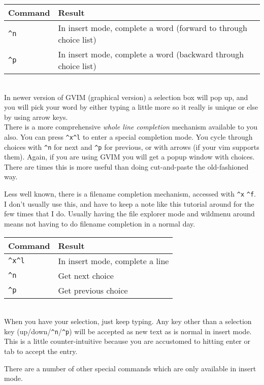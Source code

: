 \documentclass[a4paper, 12pt]{article}
\begin{document}
\begin{tabular}{ l | p{8cm} }
  \textbf{Command} & \textbf{Result}\\ \hline
  \texttt{\^{}n} & In insert mode, complete a word (forward to through choice list)\\
  \texttt{\^{}p} & In insert mode, complete a word (backward through choice list)\\ \hline
\end{tabular}\\

In newer version of GVIM (graphical version) a selection box will pop up, and you will pick your word by either typing a little more so it really is unique or else by using arrow keys.\\
There is a more comprehensive \textit{whole line completion} mechanism available to you also. You can press \texttt{\^{}x\^{}l} to enter a special completion mode. You cycle through choices with \texttt{\^{}n} for next and \texttt{\^{}p} for previous, or with arrows (if your vim supports them). Again, if you are using GVIM you will get a popup window with choices. There are times this is more useful than doing cut-and-paste the old-fashioned way.

Less well known, there is a filename completion mechanism, accessed with \texttt{\^{}x} \texttt{\^{}f}. I don't usually use this, and have to keep a note like this tutorial around for the few times that I do. Usually having the file explorer mode and wildmenu around means not having to do filename completion in a normal day.

\begin{tabular}{ l | p{8cm} }
  \textbf{Command} & \textbf{Result}\\ \hline
      \texttt{\^{}x}\texttt{\^{}l}  & In insert mode, complete a line\\ \hline
      \texttt{\^{}n}	& Get next choice\\
      \texttt{\^{}p}	& Get previous choice\\ \hline
\end{tabular}\\

When you have your selection, just keep typing. Any key other than a selection key (up/down/\texttt{\^{}n}/\texttt{\^{}p}) will be accepted as new text as is normal in insert mode. This is a little counter-intuitive because you are accustomed to hitting enter or tab to accept the entry.

There are a number of other special commands which are only available in insert mode.
\end{document}
